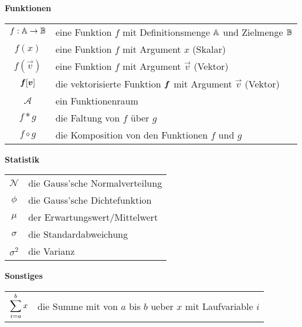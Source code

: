 \begin{center}\textbf{Funktionen}\end{center}
\begin{tabular}{cl}
  $f: \mathbb{A} \to \mathbb{B}$ & eine Funktion $f$ mit Definitionsmenge $\mathbb{A}$ und Zielmenge $\mathbb{B}$ \\
  $f(x)$ & eine Funktion $f$ mit Argument $x$ (Skalar) \\
  $f(\vec{v})$ & eine Funktion $f$ mit Argument $\vec{v}$ (Vektor) \\
  $\bm{f}[\bm{v}]$ & die vektorisierte Funktion $\bm{f}$ mit Argument $\vec{v}$ (Vektor) \\
  $\mathcal{A}$ & ein Funktionenraum \\
  $f * g$ & die Faltung von $f$ über $g$ \\
  $f \circ g$ & die Komposition von den Funktionen $f$ und $g$ \\

\end{tabular}

\begin{center}\textbf{Statistik}\end{center}
\begin{tabular}{cl}
  $\mathcal{N}$ & die Gauss'sche Normalverteilung \\
  $\phi$ & die Gauss'sche Dichtefunktion \\
  $\mu$ & der Erwartungswert/Mittelwert \\
  $\sigma$ & die Standardabweichung \\
  $\sigma^2$ & die Varianz
\end{tabular}

\begin{center}\textbf{Sonstiges}\end{center}
\begin{tabular}{cl}
  $\displaystyle\sum_{i=a}^b x$ & die Summe mit von $a$ bis $b$ ueber $x$ mit Laufvariable $i$ \\
\end{tabular}




